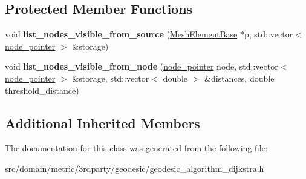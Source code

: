 \subsection*{Protected Member Functions}
\begin{DoxyCompactItemize}
\item 
\hypertarget{classgeodesic_1_1_geodesic_algorithm_dijkstra_aeec97299e8830773b87c152b52ab42f1}{}void {\bfseries list\+\_\+nodes\+\_\+visible\+\_\+from\+\_\+source} (\hyperlink{classgeodesic_1_1_mesh_element_base}{Mesh\+Element\+Base} $\ast$p, std\+::vector$<$ \hyperlink{classgeodesic_1_1_dijkstra_node}{node\+\_\+pointer} $>$ \&storage)\label{classgeodesic_1_1_geodesic_algorithm_dijkstra_aeec97299e8830773b87c152b52ab42f1}

\item 
\hypertarget{classgeodesic_1_1_geodesic_algorithm_dijkstra_ad04ebd924efcc40d5c1dd8b31532a81a}{}void {\bfseries list\+\_\+nodes\+\_\+visible\+\_\+from\+\_\+node} (\hyperlink{classgeodesic_1_1_dijkstra_node}{node\+\_\+pointer} node, std\+::vector$<$ \hyperlink{classgeodesic_1_1_dijkstra_node}{node\+\_\+pointer} $>$ \&storage, std\+::vector$<$ double $>$ \&distances, double threshold\+\_\+distance)\label{classgeodesic_1_1_geodesic_algorithm_dijkstra_ad04ebd924efcc40d5c1dd8b31532a81a}

\end{DoxyCompactItemize}
\subsection*{Additional Inherited Members}


The documentation for this class was generated from the following file\+:\begin{DoxyCompactItemize}
\item 
src/domain/metric/3rdparty/geodesic/geodesic\+\_\+algorithm\+\_\+dijkstra.\+h\end{DoxyCompactItemize}
